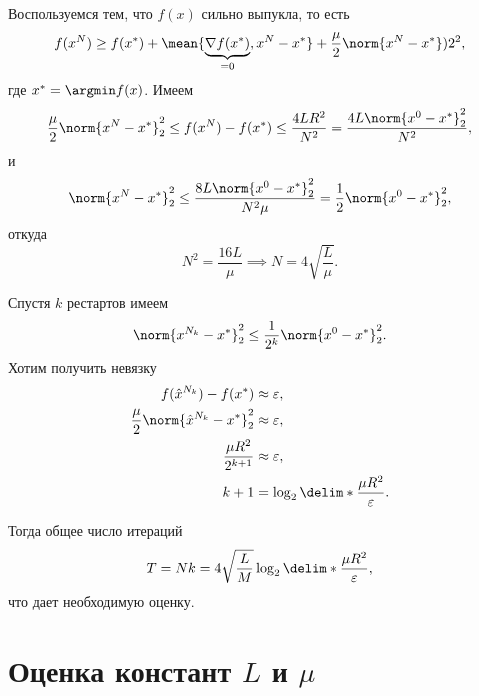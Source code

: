 Воспользуемся тем, что $f(x)$ сильно выпукла, то есть
\begin{equation*}
    f(x^N) \geq f(x^*) + \mean{\underbrace{\nabla f(x^*)}_{= 0}, x^N - x^*} + \frac{\mu}{2} \norm{x^N - x^*})2^2,
\end{equation*}
где $x^* = \argmin f(x)$.
Имеем
\begin{equation*}
    \frac{\mu}{2}\norm{x^N - x^*}_2^2 \leq f(x^N) - f(x^*) \leq \frac{4LR^2}{N^2} = \frac{4L\norm{x^0 - x^*}_2^2}{N^2},
\end{equation*}
и
\begin{equation*}
    \norm{x^N - x^*}_2^2 \leq \frac{8L\norm{x^0 - x^*}_2^2}{N^2\mu} = \frac{1}{2}\norm{x^0 - x^*}_2^2,
\end{equation*}
откуда
\begin{equation*}
    N^2 = \frac{16L}{\mu} \implies N = 4\sqrt{\frac{L}{\mu}}.
\end{equation*}

Спустя $k$ рестартов имеем
\begin{equation*}
    \norm{x^{N_k} - x^*}_2^2 \leq \frac{1}{2^k} \norm{x^0 - x^*}_2^2.
\end{equation*}
Хотим получить невязку
\begin{align*}
    f(\hat{x}^{N_k}) - f(x^*) &\approx \varepsilon, \\
    \frac{\mu}{2}\norm{\hat{x}^{N_k} - x^*}_2^2 &\approx \varepsilon, \\
    \frac{\mu R^2}{2^{k + 1}} &\approx \varepsilon, \\
    k + 1 &= \log_2 \delim*{\frac{\mu R^2}{\varepsilon}}.
\end{align*}

Тогда общее число итераций
\begin{equation*}
    T = Nk = 4\sqrt{\frac{L}{M}}\log_2\delim*{\frac{\mu R^2}{\varepsilon}},
\end{equation*}
что дает необходимую оценку.

\section{Оценка констант $L$ и $\mu$}

